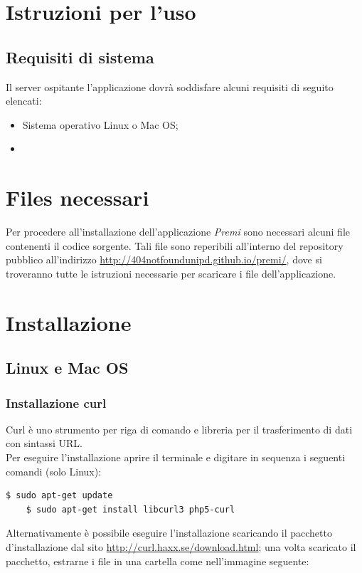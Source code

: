 \section{Istruzioni per l'uso}
\subsection{Requisiti di sistema}
Il server ospitante l'applicazione dovrà soddisfare alcuni requisiti di seguito elencati:
\begin{itemize}
\item Sistema operativo Linux o Mac OS;
\item 
\end{itemize}

\section{Files necessari}
Per procedere all'installazione dell'applicazione \emph{Premi} sono necessari alcuni file contenenti il codice sorgente.
Tali file sono reperibili all'interno del repository pubblico all'indirizzo \href{http://404notfoundunipd.github.io/premi/}{http://404notfoundunipd.github.io/premi/}, dove si troveranno tutte le istruzioni necessarie per scaricare i file dell'applicazione.

\section{Installazione}
\subsection{Linux e Mac OS}

\subsubsection{Installazione curl}
Curl è uno strumento per riga di comando e libreria per il trasferimento di dati con sintassi URL. \\

Per eseguire l'installazione aprire il terminale e digitare in sequenza i seguenti comandi (solo Linux):

\begin{lstlisting}[style=DOS]
	$ sudo apt-get update
	$ sudo apt-get install libcurl3 php5-curl
\end{lstlisting}

Alternativamente è possibile eseguire l'installazione scaricando il pacchetto d'installazione dal sito \href{http://curl.haxx.se/download.html}{http://curl.haxx.se/download.html}; una volta scaricato il pacchetto, estrarne i file in una cartella come nell'immagine seguente:


